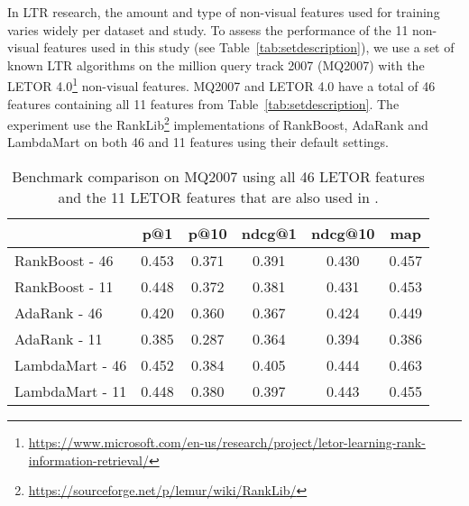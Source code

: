 In \ac{LTR} research, the amount and type of non-visual features used for training varies widely per dataset and study.
To assess the performance of the 11 non-visual features used in this study (see Table~\ref{tab:setdescription}), we use a set of known LTR algorithms on the million query track 2007 (MQ2007)\cite{allan2007million} with the LETOR 4.0\footnote{\url{https://www.microsoft.com/en-us/research/project/letor-learning-rank-information-retrieval/}} non-visual features.
MQ2007 and LETOR 4.0 have a total of 46 features containing all 11 features from Table~\ref{tab:setdescription}.
The experiment use the RankLib\footnote{\url{https://sourceforge.net/p/lemur/wiki/RankLib/}} implementations of RankBoost, AdaRank and LambdaMart on both 46 and 11 features using their default settings. 

\begin{table}[h]
\caption{Benchmark comparison on MQ2007 using all 46 LETOR features and the 11 LETOR features that are also used in \datasetname.}
\label{tab:11vs46}
\centering
\begin{tabular}{lccccc}
\toprule
           & p@1  & p@10   & ndcg@1 & ndcg@10 & map \\ 
\midrule
RankBoost - 46 & 0.453 & 0.371 & 0.391 & 0.430  & 0.457 \\
RankBoost - 11 & 0.448 & 0.372 & 0.381  & 0.431   & 0.453 \\
\midrule
AdaRank - 46  & 0.420 & 0.360 & 0.367 & 0.424  & 0.449 \\
AdaRank - 11  & 0.385 & 0.287 & 0.364  & 0.394   & 0.386 \\ 
\midrule
LambdaMart - 46 & 0.452 & 0.384 & 0.405 & 0.444  & 0.463 \\
LambdaMart - 11 & 0.448 & 0.380 & 0.397  & 0.443   & 0.455 \\
\bottomrule
\end{tabular}
\end{table}

